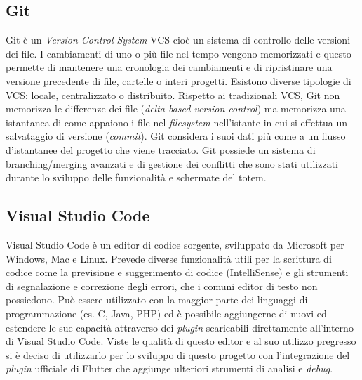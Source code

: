 \subsection{Git}
Git \cite{gitSite} è un \textit{Version Control System} VCS cioè un sistema di controllo delle versioni dei file. I cambiamenti di uno o più file nel tempo vengono memorizzati e questo permette di mantenere una cronologia dei cambiamenti e di ripristinare una versione precedente di file, cartelle o interi progetti. Esistono diverse tipologie di VCS: locale, centralizzato o distribuito.
Rispetto ai tradizionali VCS, Git non memorizza le differenze dei file (\textit{delta-based version control}) ma memorizza una istantanea di come appaiono i file nel \textit{filesystem} nell'istante in cui si effettua un salvataggio di versione (\textit{commit}). Git considera i suoi dati più come a un flusso d'istantanee del progetto che viene tracciato. Git possiede un sistema di branching/merging avanzati e di gestione dei conflitti che sono stati utilizzati durante lo sviluppo delle funzionalità e schermate del totem.

\subsection{Visual Studio Code}
Visual Studio Code \cite{vsCodeSite} è un editor di codice sorgente, sviluppato da Microsoft per Windows, Mac e Linux. Prevede diverse funzionalità utili per la scrittura di codice come la previsione e suggerimento di codice (IntelliSense) e gli strumenti di segnalazione e correzione degli errori, che i comuni editor di testo non possiedono.
Può essere utilizzato con la maggior parte dei linguaggi di programmazione (es. C, Java, PHP) ed è possibile aggiungerne di nuovi ed estendere le sue capacità attraverso dei \textit{plugin} scaricabili direttamente all'interno di Visual Studio Code.
Viste le qualità di questo editor e al suo utilizzo pregresso si è deciso di utilizzarlo per lo sviluppo di questo progetto con l'integrazione del \textit{plugin} ufficiale di Flutter che aggiunge ulteriori strumenti di analisi e \textit{debug}.